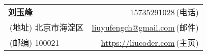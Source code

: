 
\newcommand{\myheader}{
	\begin{tabular*}{\textwidth}{l@{\extracolsep{\fill}}r}
  		\textbf{\href{http://herechen.github.io}{\LARGE 刘玉峰}} & 15735291028$\,${\color{labelgrey}(电话)}  \\
  		$\,${\color{labelgrey}(地址)} 北京市海淀区 & \href{mailto:liuyufengch@gmail.com}{liuyufengch@gmail.com}$\,${\color{labelgrey}(邮件)}  \\
  		$\,${\color{labelgrey}(邮编)} 100021 & \href{https://iucoder.com}{https://liucoder.com}$\,${\color{labelgrey}(主页)}  \\
 	 \end{tabular*}\\\vspace{0.1in}
}
\myheader

